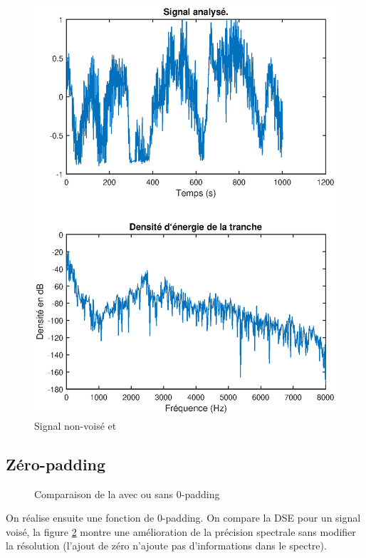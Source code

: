 \documentclass[french]{article}
\begin{document}
\begin{figure}[h!]
\begin{minipage}{0.45\textwidth}
	\includegraphics[width=\textwidth]{images/tfd_nonvoise.eps}
	\caption{Signal non-voisé et }
	\label{fig:dse_nonvois}
	\end{minipage}
\end{figure}



\FloatBarrier
\subsection{Zéro-padding}
\begin{figure}[h!]
	\centering
	
	\caption{Comparaison de la  avec ou sans 0-padding}
	\label{fig:dse_0_padding}
\end{figure}
On réalise ensuite une fonction de 0-padding. On compare la DSE pour un signal voisé, la figure \ref{fig:dse_0_padding} montre une amélioration de la précision spectrale sans modifier la résolution (l'ajout de zéro n'ajoute pas d'informations dans le spectre).
\end{document}
